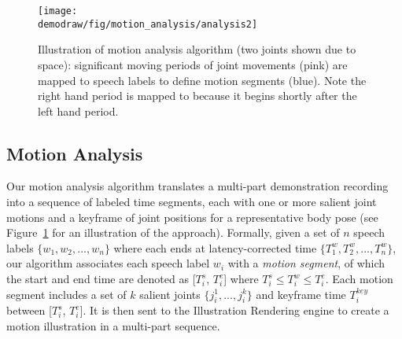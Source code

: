
%


\begin{figure}[!t]
  \centering
  \texttt{[image: \\demodraw/fig/motion\_analysis/analysis2]}
  \caption{Illustration of motion analysis algorithm (two joints shown due to space): significant moving periods of joint movements (pink) are mapped to speech labels to define motion segments (blue). Note the right hand period is mapped to  because it begins shortly after the left hand period.}
   \label{fig:segmentation}
\end{figure}

\subsection {Motion Analysis}

Our motion analysis algorithm translates a multi-part demonstration recording into a sequence of labeled time segments, each with one or more salient joint motions and a keyframe of joint positions for a representative body pose (see Figure~\ref{fig:segmentation} for an illustration of the approach).
Formally, given a set of $n$ speech labels $\{w_1, w_2, ..., w_n\}$ where each ends at latency-corrected time $\{T_1^w, T_2^w, ..., T_n^w\}$, our algorithm associates each speech label $w_i$ with a \emph{motion segment}, of which the start and end time are denoted as [$T_i^s$, $T_i^e$] where $T_i^s \leq T_i^w \leq T_i^e$. Each motion segment includes a set of $k$ salient joints $\{j_i^1, ..., j_i^k\}$ and keyframe time $T_i^{key}$ between [$T_i^s$, $T_i^e$].
It is then sent to the Illustration Rendering engine to create a motion illustration in a multi-part sequence.

